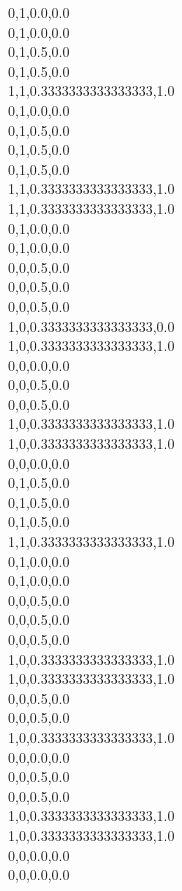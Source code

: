 0,1,0.0,0.0\\
0,1,0.0,0.0\\
0,1,0.5,0.0\\
0,1,0.5,0.0\\
1,1,0.3333333333333333,1.0\\
0,1,0.0,0.0\\
0,1,0.5,0.0\\
0,1,0.5,0.0\\
0,1,0.5,0.0\\
1,1,0.3333333333333333,1.0\\
1,1,0.3333333333333333,1.0\\
0,1,0.0,0.0\\
0,1,0.0,0.0\\
0,0,0.5,0.0\\
0,0,0.5,0.0\\
0,0,0.5,0.0\\
1,0,0.3333333333333333,0.0\\
1,0,0.3333333333333333,1.0\\
0,0,0.0,0.0\\
0,0,0.5,0.0\\
0,0,0.5,0.0\\
1,0,0.3333333333333333,1.0\\
1,0,0.3333333333333333,1.0\\
0,0,0.0,0.0\\
0,1,0.5,0.0\\
0,1,0.5,0.0\\
0,1,0.5,0.0\\
1,1,0.3333333333333333,1.0\\
0,1,0.0,0.0\\
0,1,0.0,0.0\\
0,0,0.5,0.0\\
0,0,0.5,0.0\\
0,0,0.5,0.0\\
1,0,0.3333333333333333,1.0\\
1,0,0.3333333333333333,1.0\\
0,0,0.5,0.0\\
0,0,0.5,0.0\\
1,0,0.3333333333333333,1.0\\
0,0,0.0,0.0\\
0,0,0.5,0.0\\
0,0,0.5,0.0\\
1,0,0.3333333333333333,1.0\\
1,0,0.3333333333333333,1.0\\
0,0,0.0,0.0\\
0,0,0.0,0.0\\
